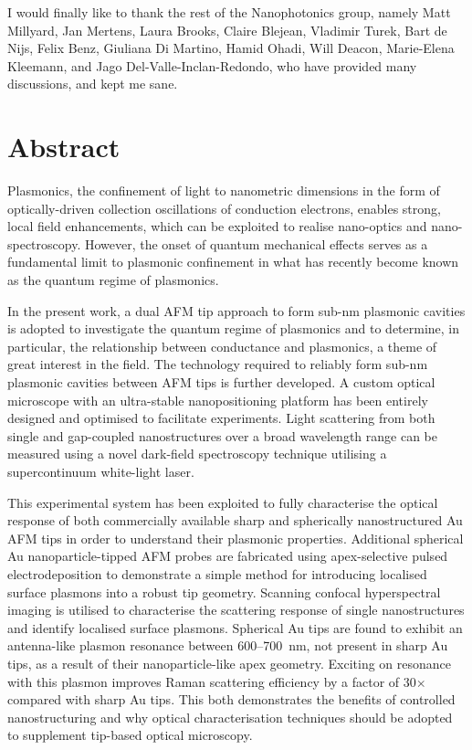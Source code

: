 \documentclass[12pt, a4paper, oneside]{book}
\begin{document}
I would finally like to thank the rest of the Nanophotonics group, namely Matt Millyard, Jan Mertens, Laura Brooks, Claire Blejean, Vladimir Turek, Bart de Nijs, Felix Benz, Giuliana Di Martino, Hamid Ohadi, Will Deacon, Marie-Elena Kleemann, and Jago Del-Valle-Inclan-Redondo, who have provided many discussions, and kept me sane.

\newpage
\section*{Abstract}

Plasmonics, the confinement of light to nanometric dimensions in the form of optically-driven collection oscillations of conduction electrons, enables strong, local field enhancements, which can be exploited to realise nano-optics and nano-spectroscopy. However, the onset of quantum mechanical effects serves as a fundamental limit to plasmonic confinement in what has recently become known as the quantum regime of plasmonics.

In the present work, a dual AFM tip approach to form sub-nm plasmonic cavities is adopted to investigate the quantum regime of plasmonics and to determine, in particular, the relationship between conductance and plasmonics, a theme of great interest in the field. The technology required to reliably form sub-nm plasmonic cavities between AFM tips is further developed. A custom optical microscope with an ultra-stable nanopositioning platform has been entirely designed and optimised to facilitate experiments. Light scattering from both single and gap-coupled nanostructures over a broad wavelength range can be measured using a novel dark-field spectroscopy technique utilising a supercontinuum white-light laser.

This experimental system has been exploited to fully characterise the optical response of both commercially available sharp and spherically nanostructured Au AFM tips in order to understand their plasmonic properties. Additional spherical Au nanoparticle-tipped AFM probes are fabricated using apex-selective pulsed electrodeposition to demonstrate a simple method for introducing localised surface plasmons into a robust tip geometry. Scanning confocal hyperspectral imaging is utilised to characterise the scattering response of single nanostructures and identify localised surface plasmons. Spherical Au tips are found to exhibit an antenna-like plasmon resonance between 600--\SI{700}{nm}, not present in sharp Au tips, as a result of their nanoparticle-like apex geometry. Exciting on resonance with this plasmon improves {\color{red}Raman scattering efficiency} by a factor of 30$\times$ compared with sharp Au tips. This both demonstrates the benefits of controlled nanostructuring and why optical characterisation techniques should be adopted to supplement tip-based optical microscopy.
\end{document}
